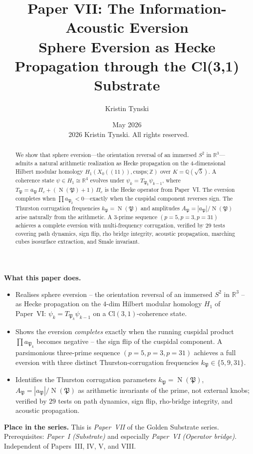 \documentclass[11pt,a4paper]{article}
\title{Paper VII: The Information-Acoustic Eversion\\[4pt]
\large Sphere Eversion as Hecke Propagation through the Cl(3,1) Substrate}
\author{Kristin Tynski}
\date{May 2026 \\[6pt] {\small\textcopyright\ 2026 Kristin Tynski. All rights reserved.}}
\theoremstyle{plain}
\theoremstyle{definition}
\theoremstyle{remark}
\numberwithin{equation}{section}
\providecommand{\Cl}{\mathrm{Cl}}
\providecommand{\R}{\mathbb{R}}
\providecommand{\ZZ}{\mathbb{Z}}
\providecommand{\QQ}{\mathbb{Q}}
\providecommand{\RR}{\mathbb{R}}
\providecommand{\fP}{\mathfrak{P}}
\DeclareMathOperator{\Nm}{N}
\begin{document}
\maketitle

\begin{abstract}
We show that sphere eversion---the orientation reversal of an immersed
$S^2$ in $\RR^3$---admits a natural arithmetic realization as Hecke
propagation on the 4-dimensional Hilbert modular homology
$H_1(X_0((11)), \mathrm{cusps}; \ZZ)$ over $K = \QQ(\sqrt{5})$.
A coherence state $\psi \in H_1 \cong \RR^4$ evolves under
$\psi_k = T_{\fP_k}\psi_{k-1}$, where $T_\fP = a_\fP\,\Pi_c + (\Nm(\fP)+1)\,\Pi_e$
is the Hecke operator from Paper~VI.  The eversion completes when
$\prod a_{\fP_k} < 0$---exactly when the cuspidal component reverses sign.
The Thurston corrugation frequencies $k_\fP = \Nm(\fP)$ and amplitudes
$A_\fP = |a_\fP|/\Nm(\fP)$ arise naturally from the arithmetic.
A 3-prime sequence $(p=5, p=3, p=31)$ achieves a complete eversion with
multi-frequency corrugation, verified by 29 tests covering path dynamics,
sign flip, rho bridge integrity, acoustic propagation, marching cubes
isosurface extraction, and Smale invariant.
\end{abstract}

\medskip
\noindent\textbf{What this paper does.}
\begin{itemize}[leftmargin=1.5em,nosep,topsep=2pt]
  \item Realises sphere eversion -- the orientation reversal of an
        immersed $S^{2}$ in $\R^{3}$ -- as Hecke propagation on the
        $4$-dim Hilbert modular homology $H_{1}$ of Paper~VI:
        $\psi_k = T_{\fP_k}\psi_{k-1}$ on a $\Cl(3,1)$-coherence
        state.
  \item Shows the eversion \emph{completes} exactly when the running
        cuspidal product $\prod a_{\fP_k}$ becomes negative -- the
        sign flip of the cuspidal component.  A parsimonious
        three-prime sequence $(p=5, p=3, p=31)$ achieves a full
        eversion with three distinct Thurston-corrugation
        frequencies $k_\fP \in \{5,9,31\}$.
  \item Identifies the Thurston corrugation parameters
        $k_\fP = \Nm(\fP)$, $A_\fP = |a_\fP|/\Nm(\fP)$ as
        arithmetic invariants of the prime, not external knobs;
        verified by $29$ tests on path dynamics, sign flip,
        rho-bridge integrity, and acoustic propagation.
\end{itemize}

\medskip
\noindent\textbf{Place in the series.}
This is \emph{Paper~VII} of the Golden Substrate series.
Prerequisites: \emph{Paper~I (Substrate)} and especially
\emph{Paper~VI (Operator bridge)}.  Independent of Papers~III, IV,
V, and VIII.
\end{document}
